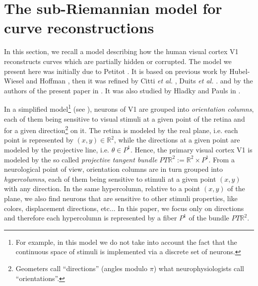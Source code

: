 \documentclass[proc]{edpsmath}
\newcommand{\R}{\mathbb{R}}
\newcommand{\PTR}{PT\R^2}
\begin{document}
\section{The sub-Riemannian model for curve reconstructions}
\label{s-petitot}

In this section, we recall a model describing how the human visual cortex V1 reconstructs curves which are partially hidden or corrupted.
The model we present here was initially due to Petitot \cite{petitot,petitot-libro}. It is based on previous work by Hubel-Wiesel \cite{hubel} and Hoffman \cite{hoffman}, then it was refined by Citti \emph{et al.} \cite{citti-sarti,Citti2016}, Duits \emph{et al.} \cite{Duits2008,Duits2010,Duits2010a,Duits2014}.
and by the authors of the present paper in \cite{Remizov2013,Boscain2012a,Boscain2014,ahe}. It was also studied by Hladky and Pauls in \cite{Hladky}.

In a simplified model\footnote{For example, in this model we do not take into account the fact that the continuous space of stimuli is implemented via a discrete set of neurons.} (see \cite[p. 79]{petitot-libro}), neurons of V1 are grouped into {\it orientation columns}, each of them being sensitive to visual stimuli at a given point of the retina and for a given direction\footnote{Geometers call ``directions'' (angles modulo $\pi$) what neurophysiologists call ``orientations''.} on it. The retina is modeled by the real plane, i.e. each point is represented by $(x,y)\in\R^2$, while the directions at a given point are modeled by the projective line, i.e. $\theta\in P^1$. Hence, the primary visual cortex V1 is modeled by the so called {\it projective tangent bundle} $\PTR:=\R^2\times P^1$. From a neurological point of view, orientation columns are in turn grouped into {\it hypercolumns}, each of them being sensitive to stimuli at a given point $(x,y)$ with any direction. In the same hypercolumn, relative to a point $(x,y)$ of the plane, we also find neurons that are sensitive to other stimuli properties, like colors, displacement directions, etc...  In this paper, we  focus only on directions and therefore  each hypercolumn is represented by a fiber $P^1$ of the bundle $\PTR$.
\end{document}
